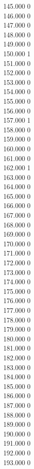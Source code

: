 { 145.000	0 \\
 146.000	0 \\
 147.000	0 \\
 148.000	0 \\
 149.000	0 \\
 150.000	1 \\
 151.000	0 \\
 152.000	0 \\
 153.000	0 \\
 154.000	0 \\
 155.000	0 \\
 156.000	0 \\
 157.000	1 \\
 158.000	0 \\
 159.000	0 \\
 160.000	0 \\
 161.000	0 \\
 162.000	1 \\
 163.000	0 \\
 164.000	0 \\
 165.000	0 \\
 166.000	0 \\
 167.000	0 \\
 168.000	0 \\
 169.000	0 \\
 170.000	0 \\
 171.000	0 \\
 172.000	0 \\
 173.000	0 \\
 174.000	0 \\
 175.000	0 \\
 176.000	0 \\
 177.000	0 \\
 178.000	0 \\
 179.000	0 \\
 180.000	0 \\
 181.000	0 \\
 182.000	0 \\
 183.000	0 \\
 184.000	0 \\
 185.000	0 \\
 186.000	0 \\
 187.000	0 \\
 188.000	0 \\
 189.000	0 \\
 190.000	0 \\
 191.000	0 \\
 192.000	0 \\
 193.000	0 \\
}
